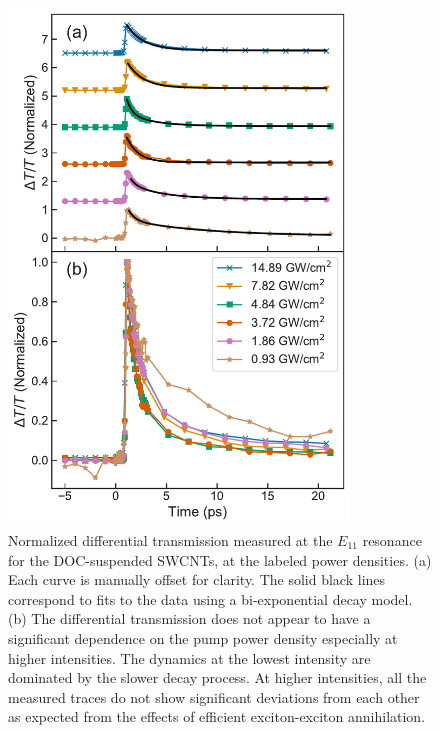 \begin{figure}[ht]
	\centering
	\includegraphics[height=5.4in]{images/chapter_my_data/Weilu_CNT_diff_trans_fits_and_normalized}
	\caption{ Normalized differential transmission measured at the $E_{11}$ resonance for the DOC-suspended SWCNTs, at the labeled power densities. (a) Each curve is manually offset for clarity. The solid black lines correspond to fits to the data using a bi-exponential decay model. (b) The differential transmission does not appear to have a significant dependence on the pump power density especially at higher intensities. The dynamics at the lowest intensity are dominated by the slower decay process. At higher intensities, all the measured traces do not show significant deviations from each other as expected from the effects of efficient exciton-exciton annihilation. }
	\label{fig:weilu_cnt_normalized_dt}
\end{figure}




